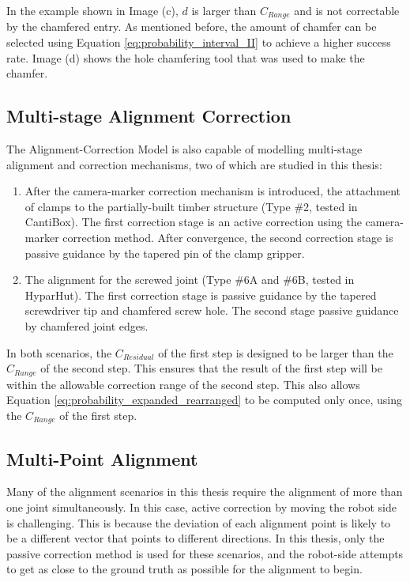 In the example shown in Image (c), $d$ is larger than $C_{Range}$ and is not correctable by the chamfered entry. As mentioned before, the amount of chamfer can be selected using Equation \ref{eq:probability_interval_II} to achieve a higher success rate. Image (d) shows the hole chamfering tool that was used to make the chamfer.



\subsection{Multi-stage Alignment Correction}
\label{subsection:new_hypo_multi_stage_alignment_correction}

The Alignment-Correction Model is also capable of modelling multi-stage alignment and correction mechanisms, two of which are studied in this thesis:

\begin{enumerate}
	\item After the camera-marker correction mechanism is introduced, the attachment of clamps to the partially-built timber structure (Type \#2, tested in CantiBox). The first correction stage is an active correction using the camera-marker correction method. After convergence, the second correction stage is passive guidance by the tapered pin of the clamp gripper.

	\item The alignment for the screwed joint (Type \#6A and \#6B, tested in HyparHut). The first correction stage is passive guidance by the tapered screwdriver tip and chamfered screw hole. The second stage passive guidance by chamfered joint edges. 

\end{enumerate}
In both scenarios, the $C_{Residual}$ of the first step is designed to be larger than the $C_{Range}$ of the second step. This ensures that the result of the first step will be within the allowable correction range of the second step. This also allows Equation \ref{eq:probability_expanded_rearranged} to be computed only once, using the $C_{Range}$ of the first step.

\subsection{Multi-Point Alignment}
\label{subsection:new_hypo_multi_point_alignment}

Many of the alignment scenarios in this thesis require the alignment of more than one joint simultaneously. In this case, active correction by moving the robot side is challenging. This is because the deviation of each alignment point is likely to be a different vector that points to different directions. In this thesis, only the passive correction method is used for these scenarios, and the robot-side attempts to get as close to the ground truth as possible for the alignment to begin. 

